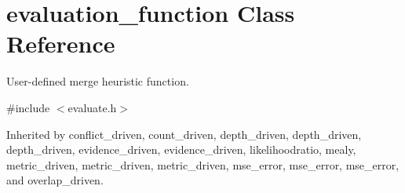 \hypertarget{classevaluation__function}{}\section{evaluation\+\_\+function Class Reference}
\label{classevaluation__function}


User-\/defined merge heuristic function.  




{\ttfamily \#include $<$evaluate.\+h$>$}



Inherited by conflict\+\_\+driven, count\+\_\+driven, depth\+\_\+driven, depth\+\_\+driven, depth\+\_\+driven, evidence\+\_\+driven, evidence\+\_\+driven, likelihoodratio, mealy, metric\+\_\+driven, metric\+\_\+driven, metric\+\_\+driven, mse\+\_\+error, mse\+\_\+error, mse\+\_\+error, and overlap\+\_\+driven.

